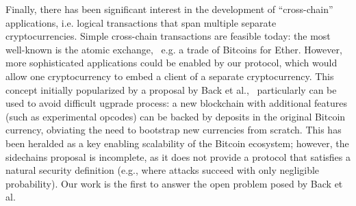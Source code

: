   Finally, there has been significant interest in the development of ``cross-chain'' applications, i.e. logical transactions that span multiple separate cryptocurrencies.
  Simple cross-chain transactions are feasible today: the most well-known is the atomic exchange,~\cite{tiernolan} e.g. a trade of Bitcoins for Ether.
  However, more sophisticated applications could be enabled by our protocol, which would allow one cryptocurrency to embed a client of a separate cryptocurrency.
  This concept initially popularized by a proposal by Back et al.,~\cite{sidechains} particularly can be used to avoid difficult ugprade process: a new blockchain with additional features (such as experimental opcodes) can be backed by deposits in the original Bitcoin currency, obviating the need to bootstrap new currencies from scratch.
  This has been heralded as a key enabling scalability of the Bitcoin ecosystem;
  however, the sidechains proposal is incomplete, as it does not provide a protocol that satisfies a natural security definition (e.g., where attacks succeed with only negligible probability). Our work is the first to answer the open problem posed by Back et al.

\noindent
